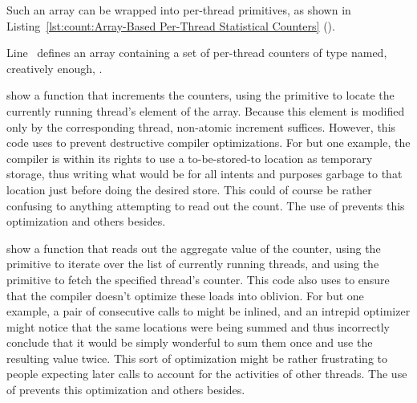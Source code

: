 Such an array can be wrapped into per-thread primitives, as shown in
Listing~\ref{lst:count:Array-Based Per-Thread Statistical Counters}
().
\begin{fcvref}
Line~ defines an array containing a set of per-thread counters of
type  named, creatively enough, .

show a function that increments the counters, using the
 primitive to locate the currently running
thread's element of the  array.
Because this element is modified only by the corresponding thread,
non-atomic increment suffices.
However, this code uses  to prevent destructive compiler
optimizations.
For but one example, the compiler is within its rights to use a
to-be-stored-to location as temporary storage, thus writing what
would be for all intents and purposes garbage to that location
just before doing the desired store.
This could of course be rather confusing to anything attempting to
read out the count.
The use of  prevents this optimization and others besides.

\QuickQuizEnd

show a function that reads out the aggregate value of the counter,
using the  primitive to iterate over the list of
currently running threads, and using the  primitive
to fetch the specified thread's counter.
This code also uses  to ensure that the compiler doesn't
optimize these loads into oblivion.
For but one example, a pair of consecutive calls to 
might be inlined, and an intrepid optimizer might notice that the same
locations were being summed and thus incorrectly conclude that it would
be simply wonderful to sum them once and use the resulting value twice.
This sort of optimization might be rather frustrating to people expecting
later  calls to account for the activities of other
threads.
The use of  prevents this optimization and others besides.
\end{fcvref}

